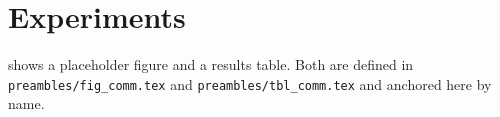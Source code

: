 \section{Experiments}
\label{sec:exp}

 shows a placeholder figure and 
a results table. Both are defined in \texttt{preambles/fig\_comm.tex} and
\texttt{preambles/tbl\_comm.tex} and anchored here by name.

\figPlaceholder
\tblResults

\lipsum[3]
